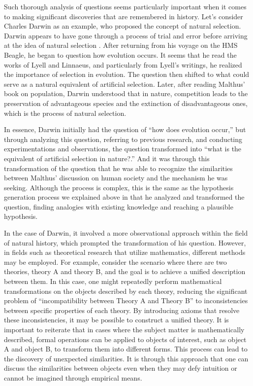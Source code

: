 Such thorough analysis of questions seems particularly important when it comes to making significant discoveries that are remembered in history. Let's consider Charles Darwin as an example, who proposed the concept of natural selection. Darwin appears to have gone through a process of trial and error before arriving at the idea of natural selection \cite{gribbin2022origin}. After returning from his voyage on the HMS Beagle, he began to question how evolution occurs. It seems that he read the works of Lyell and Linnaeus, and particularly from Lyell's writings, he realized the importance of selection in evolution. The question then shifted to what could serve as a natural equivalent of artificial selection. Later, after reading Malthus' book on population, Darwin understood that in nature, competition leads to the preservation of advantageous species and the extinction of disadvantageous ones, which is the process of natural selection.

In essence, Darwin initially had the question of ``how does evolution occur,'' but through analyzing this question, referring to previous research, and conducting experimentations and observations, the question transformed into ``what is the equivalent of artificial selection in nature?.'' And it was through this transformation of the question that he was able to recognize the similarities between Malthus' discussion on human society and the mechanism he was seeking. Although the process is complex, this is the same as the hypothesis generation process we explained above in that he analyzed and transformed the question, finding analogies with existing knowledge and reaching a plausible hypothesis.

In the case of Darwin, it involved a more observational approach within the field of natural history, which prompted the transformation of his question. However, in fields such as theoretical research that utilize mathematics, different methods may be employed. For example, consider the scenario where there are two theories, theory A and theory B, and the goal is to achieve a unified description between them. In this case, one might repeatedly perform mathematical transformations on the objects described by each theory, reducing the significant problem of ``incompatibility between Theory A and Theory B'' to inconsistencies between specific properties of each theory. By introducing axioms that resolve these inconsistencies, it may be possible to construct a unified theory. It is important to reiterate that in cases where the subject matter is mathematically described, formal operations can be applied to objects of interest, such as object A and object B, to transform them into different forms. This process can lead to the discovery of unexpected similarities. It is through this approach that one can discuss the similarities between objects even when they may defy intuition or cannot be imagined through empirical means. 

